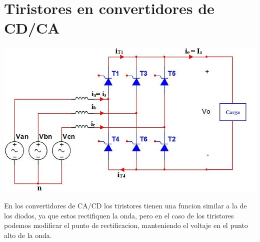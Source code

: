 \documentclass[10pt,a4paper]{article}
\begin{document}
\section{Tiristores en convertidores de CD/CA}
\begin{center}
\includegraphics{03.jpg}
\end{center}
En los convertidores de CA/CD los tiristores tienen una funcion similar a la de los diodos, ya que estos rectifiquen la onda, pero en el caso de los tiristores podemos modificar el punto de rectificacion, manteniendo el voltaje en el punto alto de la onda.
\end{document}
